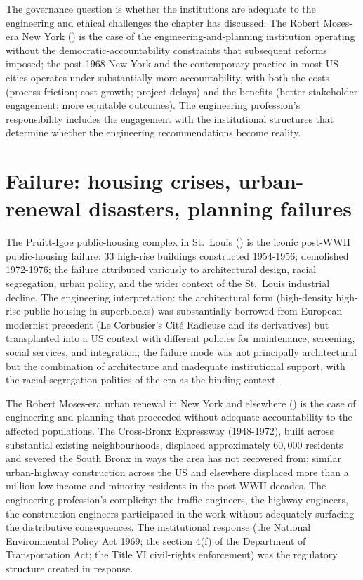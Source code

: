 The governance question is whether the institutions are adequate to the engineering and ethical challenges the chapter has discussed. The Robert Moses-era New York (\cite{hist:caro-powerbroker-1974}) is the case of the engineering-and-planning institution operating without the democratic-accountability constraints that subsequent reforms imposed; the post-1968 New York and the contemporary practice in most US cities operates under substantially more accountability, with both the costs (process friction; cost growth; project delays) and the benefits (better stakeholder engagement; more equitable outcomes). The engineering profession's responsibility includes the engagement with the institutional structures that determine whether the engineering recommendations become reality.

\section{Failure: housing crises, urban-renewal disasters, planning failures}

The Pruitt-Igoe public-housing complex in St.\ Louis (\cite{hist:bristol-pruitt-igoe-1991}) is the iconic post-WWII public-housing failure: $33$ high-rise buildings constructed 1954-1956; demolished 1972-1976; the failure attributed variously to architectural design, racial segregation, urban policy, and the wider context of the St.\ Louis industrial decline. The engineering interpretation: the architectural form (high-density high-rise public housing in superblocks) was substantially borrowed from European modernist precedent (Le Corbusier's Cit{\'e} Radieuse and its derivatives) but transplanted into a US context with different policies for maintenance, screening, social services, and integration; the failure mode was not principally architectural but the combination of architecture and inadequate institutional support, with the racial-segregation politics of the era as the binding context.

The Robert Moses-era urban renewal in New York and elsewhere (\cite{hist:caro-powerbroker-1974}) is the case of engineering-and-planning that proceeded without adequate accountability to the affected populations. The Cross-Bronx Expressway (1948-1972), built across substantial existing neighbourhoods, displaced approximately $60{,}000$ residents and severed the South Bronx in ways the area has not recovered from; similar urban-highway construction across the US and elsewhere displaced more than a million low-income and minority residents in the post-WWII decades. The engineering profession's complicity: the traffic engineers, the highway engineers, the construction engineers participated in the work without adequately surfacing the distributive consequences. The institutional response (the National Environmental Policy Act 1969; the section 4(f) of the Department of Transportation Act; the Title VI civil-rights enforcement) was the regulatory structure created in response.

